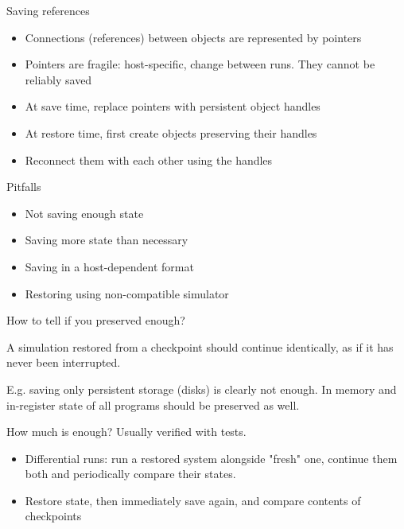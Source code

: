 \begin{frame}{Saving references}

\begin{itemize}
\item Connections (references) between objects are represented by pointers
\item Pointers are fragile: host-specific, change between runs. They cannot be reliably saved
\end{itemize}

\begin{itemize}
    \item At save time, replace pointers with persistent object handles
    \item At restore time, first create objects preserving their handles
    \item Reconnect them with each other using the handles
\end{itemize}

\end{frame}

\begin{frame}{Pitfalls}
\begin{itemize}
    \item Not saving enough state
    \item Saving more state than necessary
    \item Saving in a host-dependent format
    \item Restoring using non-compatible simulator
\end{itemize}
\end{frame}

\begin{frame}{How to tell if you preserved enough?}

A simulation restored from a checkpoint should continue identically, as if it has never been interrupted.

E.g. saving only persistent storage (disks) is clearly not enough. In memory and in-register state of all programs should be preserved as well.

How much is enough? Usually verified with tests.

\begin{itemize}
    \item Differential runs: run a restored system alongside "fresh" one, continue them both and periodically compare their states.
    \item Restore state, then immediately save again, and compare contents of checkpoints
\end{itemize}

\end{frame}

